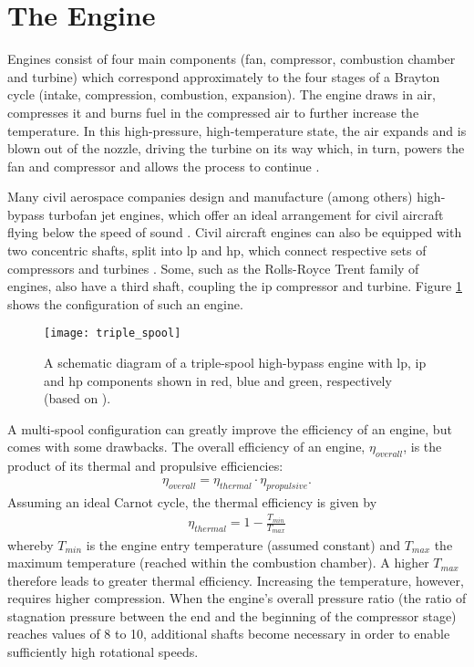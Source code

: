 \section{The Engine}
Engines consist of four main components (fan, compressor, combustion chamber and turbine) which correspond approximately to the four stages of a Brayton cycle (intake, compression, combustion, expansion). The engine draws in air, compresses it and burns fuel in the compressed air to further increase the temperature. In this high-pressure, high-temperature state, the air expands and is blown out of the nozzle, driving the turbine on its way which, in turn, powers the fan and compressor and allows the process to continue \cite[]{rolls-royce_plc_jet_2015}.

Many civil aerospace companies design and manufacture (among others) high-bypass turbofan jet engines, which offer an ideal arrangement for civil aircraft flying below the speed of sound \cite[]{rolls-royce_plc_jet_2015}. Civil aircraft engines can also be equipped with two concentric shafts, split into \ac{lp} and \ac{hp}, which connect respective sets of compressors and turbines \cite[]{spittle_gas_2003}. Some, such as the Rolls-Royce Trent family of engines, also have a third shaft, coupling the \ac{ip} compressor and turbine. Figure \ref{fig:triple_spool} shows the configuration of such an engine.

\begin{figure}[tb!]
    \centering
    \texttt{[image: triple\_spool]}
    \caption{\label{fig:triple_spool} A schematic diagram of a triple-spool high-bypass engine with \ac{lp}, \ac{ip} and \ac{hp} components shown in red, blue and green, respectively (based on \protect\citet{rolls-royce_plc_jet_2015}).}
\end{figure}

A multi-spool configuration can greatly improve the efficiency of an engine, but comes with some drawbacks. The overall efficiency of an engine, \(\eta_{overall}\), is the product of its thermal and propulsive efficiencies:
\begin{align}
    \eta_{overall} = \eta_{thermal} \cdot \eta_{propulsive}.
\end{align}
Assuming an ideal Carnot cycle, the thermal efficiency is given by
\begin{align}
    \eta_{thermal} = 1 - \frac{T_{min}}{T_{max}}
\end{align}
whereby \(T_{min}\) is the engine entry temperature (assumed constant) and \(T_{max}\) the maximum temperature (reached within the combustion chamber). A higher \(T_{max}\) therefore leads to greater thermal efficiency. Increasing the temperature, however, requires %
higher compression. When the engine's overall pressure ratio (the ratio of stagnation pressure between the end and the beginning of the compressor stage) reaches values of 8 to 10, additional shafts become necessary \cite[p. 58]{braunling_flugzeugtriebwerke_2015} in order to enable sufficiently high rotational speeds.

